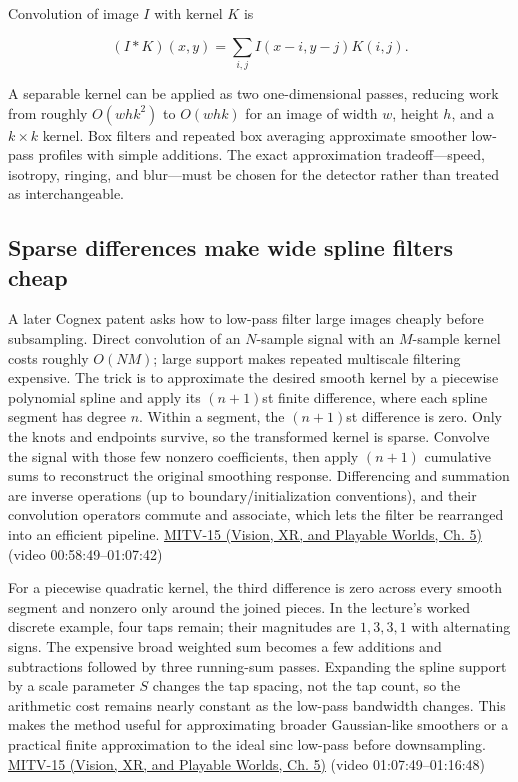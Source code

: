 Convolution of image \(I\) with kernel \(K\) is

\[
(I*K)(x,y)=\sum_{i,j}I(x-i,y-j)K(i,j).
\]

A separable kernel can be applied as two one-dimensional passes, reducing work from roughly \(O(whk^2)\) to \(O(whk)\) for an image of width \(w\), height \(h\), and a \(k\times k\) kernel. Box filters and repeated box averaging approximate smoother low-pass profiles with simple additions. The exact approximation tradeoff---speed, isotropy, ringing, and blur---must be chosen for the detector rather than treated as interchangeable.

\subsection{Sparse differences make wide spline filters cheap}\label{03-visual-computing-i-ch004-sparse-differences-make-wide-spline-filters-cheap}

\hypertarget{03-visual-computing-i-ch004-sparse-differences-make-wide-spline-filters-cheap}{}

A later Cognex patent asks how to low-pass filter large images cheaply before subsampling. Direct convolution of an \(N\)-sample signal with an \(M\)-sample kernel costs roughly \(O(NM)\); large support makes repeated multiscale filtering expensive. The trick is to approximate the desired smooth kernel by a piecewise polynomial spline and apply its \((n+1)\)st finite difference, where each spline segment has degree \(n\). Within a segment, the \((n+1)\)st difference is zero. Only the knots and endpoints survive, so the transformed kernel is sparse. Convolve the signal with those few nonzero coefficients, then apply \((n+1)\) cumulative sums to reconstruct the original smoothing response. Differencing and summation are inverse operations (up to boundary/initialization conventions), and their convolution operators commute and associate, which lets the filter be rearranged into an efficient pipeline. \href{../07-Vision-XR-and-Playable-Worlds/main.pdf\#nameddest=04-visual-computing-ii-ch036-mitv-15---alignment-patmax-distance-field-filtering-and-sub-sampling-us-7065262}{MITV-15 (Vision, XR, and Playable Worlds, Ch. 5)} (video 00:58:49--01:07:42)

For a piecewise quadratic kernel, the third difference is zero across every smooth segment and nonzero only around the joined pieces. In the lecture's worked discrete example, four taps remain; their magnitudes are \(1,3,3,1\) with alternating signs. The expensive broad weighted sum becomes a few additions and subtractions followed by three running-sum passes. Expanding the spline support by a scale parameter \(S\) changes the tap spacing, not the tap count, so the arithmetic cost remains nearly constant as the low-pass bandwidth changes. This makes the method useful for approximating broader Gaussian-like smoothers or a practical finite approximation to the ideal sinc low-pass before downsampling. \href{../07-Vision-XR-and-Playable-Worlds/main.pdf\#nameddest=04-visual-computing-ii-ch036-mitv-15---alignment-patmax-distance-field-filtering-and-sub-sampling-us-7065262}{MITV-15 (Vision, XR, and Playable Worlds, Ch. 5)} (video 01:07:49--01:16:48)


